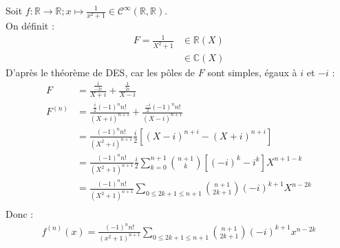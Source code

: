 \documentclass[../main.tex]{subfiles}
\begin{document}
\noindent Soit $f:\mathbb{R}\to \mathbb{R}; x\mapsto \frac{1}{x^2 + 1} \in \mathcal{C}^{\infty}(\mathbb{R}, \mathbb{R})$. \\
On définit : 
\begin{align*}
    F = \frac{1}{X^2 + 1} &\in \mathbb{R}(X) \\
    &\in \mathbb{C}(X) 
\end{align*}
D'après le théorème de DES, car les pôles de $F$ sont simples, égaux à $i$ et $-i$ : 
\begin{align*}
    F &= \frac{\frac{1}{-2i}}{X+i} + \frac{\frac{1}{2i}}{X-i} \\
    F^{(n)} &= \frac{\frac{i}{2}(-1)^n n!}{(X+i)^{n+1}} + \frac{\frac{-i}{2}(-1)^n n!}{(X-i)^{n+1}} \\
    &= \frac{(-1)^n n!}{(X^2 + i)^{n+1}} \frac{i}{2} \left[ (X-i)^{n+i} - (X+i)^{n+i} \right] \\
    &= \frac{(-1)^n n!}{(X^2 + 1)^{n+1}} \frac{i}{2} \sum_{k=0}^{n+1} \binom{n+1}{k} [(-i)^k - i^k] X^{n+1-k} \\
    &= \frac{(-1)^n n!}{(X^2 + 1)^{n+1}} \sum_{0 \leq 2k + 1 \leq n+1} \binom{n+1}{2k+1} (-i)^{k+1} X^{n-2k} \\
\end{align*}
Donc : 
\begin{align*}
    f^{(n)}(x) = \frac{(-1)^n n!}{(x^2 + 1)^{n+1}} \sum_{0 \leq 2k + 1 \leq n+1} \binom{n+1}{2k+1} (-i)^{k+1} x^{n-2k}	
\end{align*}
\end{document}
